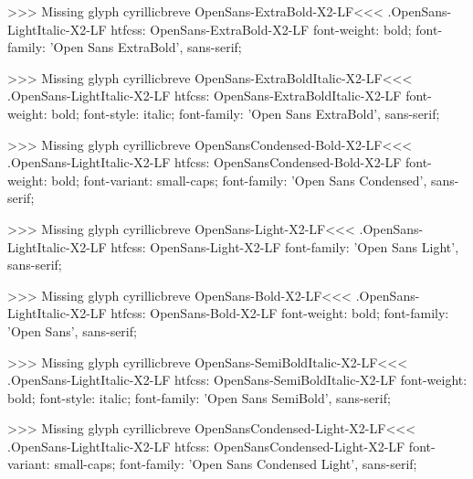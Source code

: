 >>>
Missing glyph	cyrillicbreve
\<OpenSans-ExtraBold-X2-LF\><<<
.OpenSans-LightItalic-X2-LF
htfcss:  OpenSans-ExtraBold-X2-LF  font-weight: bold; font-family: 'Open Sans ExtraBold', sans-serif;

>>>
Missing glyph	cyrillicbreve
\<OpenSans-ExtraBoldItalic-X2-LF\><<<
.OpenSans-LightItalic-X2-LF
htfcss:  OpenSans-ExtraBoldItalic-X2-LF  font-weight: bold; font-style: italic; font-family: 'Open Sans ExtraBold', sans-serif;

>>>
Missing glyph	cyrillicbreve
\<OpenSansCondensed-Bold-X2-LF\><<<
.OpenSans-LightItalic-X2-LF
htfcss:  OpenSansCondensed-Bold-X2-LF  font-weight: bold; font-variant: small-caps; font-family: 'Open Sans Condensed', sans-serif;

>>>
Missing glyph	cyrillicbreve
\<OpenSans-Light-X2-LF\><<<
.OpenSans-LightItalic-X2-LF
htfcss:  OpenSans-Light-X2-LF  font-family: 'Open Sans Light', sans-serif;

>>>
Missing glyph	cyrillicbreve
\<OpenSans-Bold-X2-LF\><<<
.OpenSans-LightItalic-X2-LF
htfcss:  OpenSans-Bold-X2-LF  font-weight: bold; font-family: 'Open Sans', sans-serif;

>>>
Missing glyph	cyrillicbreve
\<OpenSans-SemiBoldItalic-X2-LF\><<<
.OpenSans-LightItalic-X2-LF
htfcss:  OpenSans-SemiBoldItalic-X2-LF  font-weight: bold; font-style: italic; font-family: 'Open Sans SemiBold', sans-serif;

>>>
Missing glyph	cyrillicbreve
\<OpenSansCondensed-Light-X2-LF\><<<
.OpenSans-LightItalic-X2-LF
htfcss:  OpenSansCondensed-Light-X2-LF  font-variant: small-caps; font-family: 'Open Sans Condensed Light', sans-serif;

